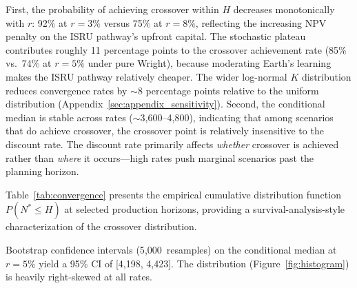 

First, the probability of achieving crossover within $H$ decreases monotonically with $r$: 92\% at $r = 3\%$ versus 75\% at $r = 8\%$, reflecting the increasing NPV penalty on the ISRU pathway's upfront capital. The stochastic plateau contributes roughly 11 percentage points to the crossover achievement rate (85\% vs.\ 74\% at $r = 5\%$ under pure Wright), because moderating Earth's learning makes the ISRU pathway relatively cheaper. The wider log-normal $K$ distribution reduces convergence rates by $\sim$8 percentage points relative to the uniform distribution (Appendix~\ref{sec:appendix_sensitivity}). Second, the conditional median is stable across rates ($\sim$3{,}600--4{,}800), indicating that among scenarios that do achieve crossover, the crossover point is relatively insensitive to the discount rate. The discount rate primarily affects \emph{whether} crossover is achieved rather than \emph{where} it occurs---high rates push marginal scenarios past the planning horizon.

Table~\ref{tab:convergence} presents the empirical cumulative distribution function $P(N^* \leq H)$ at selected production horizons, providing a survival-analysis-style characterization of the crossover distribution.



Bootstrap confidence intervals (5{,}000~resamples) on the conditional median at $r = 5\%$ yield a 95\% CI of [4{,}198, 4{,}423]. The distribution (Figure~\ref{fig:histogram}) is heavily right-skewed at all rates.

